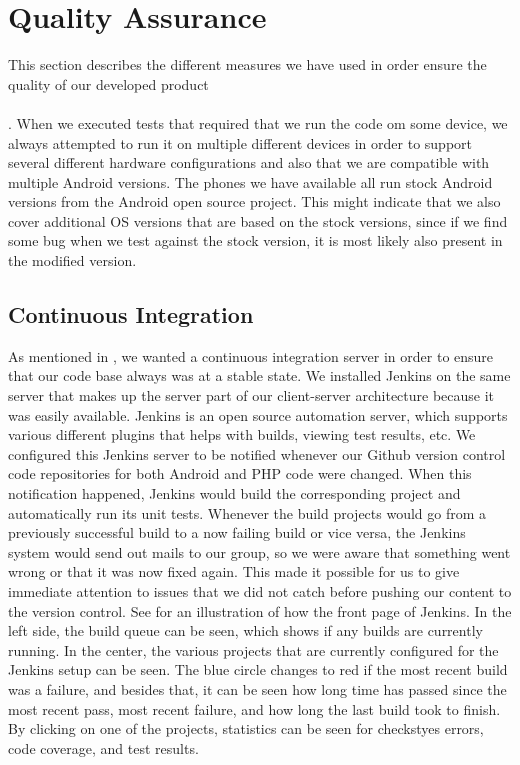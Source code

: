 
\chapter{Quality Assurance}
\label{cha:quality_assurance}

This section describes the different measures we have used in order ensure the quality of our developed product 
\\\\
. 
When we executed tests that required that we run the code om some device, we always attempted to run it on multiple different devices in order to support several different hardware configurations and also that we are compatible with multiple Android versions. The phones we have available all run stock Android versions from the Android open source project. This might indicate that we also cover additional OS versions that are based on the stock versions, since if we find some bug when we test against the stock version, it is most likely also present in the modified version. 



\section{Continuous Integration}
\label{sec:continuous_integration}
As mentioned in , we wanted a continuous integration server in order to ensure that our code base always was at a stable state. We installed Jenkins on the same server that makes up the server part of our client-server architecture because it was easily available. Jenkins is an open source automation server, which supports various different plugins that helps with builds, viewing test results, etc. We configured this Jenkins server to be notified whenever our Github version control code repositories for both Android and PHP code were changed. When this notification happened, Jenkins would build the corresponding project and automatically run its unit tests. Whenever the build projects would go from a previously successful build to a now failing build or vice versa, the Jenkins system would send out mails to our group, so we were aware that something went wrong or that it was now fixed again. This made it possible for us to give immediate attention to issues that we did not catch before pushing our content to the version control. See  for an illustration of how the front page of Jenkins. In the left side, the build queue can be seen, which shows if any builds are currently running. In the center, the various projects that are currently configured for the Jenkins setup can be seen. The blue circle changes to red if the most recent build was a failure, and besides that, it can be seen how long time has passed since the most recent pass, most recent failure, and how long the last build took to finish. By clicking on one of the projects, statistics can be seen for checkstyes errors, code coverage, and test results. 

